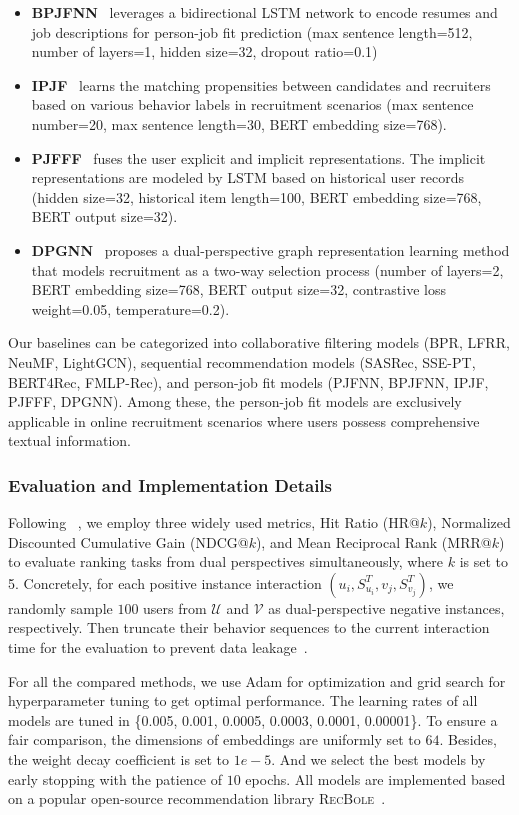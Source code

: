\begin{itemize}
\item {\textbf{BPJFNN}~\cite{qin2018enhancing}} leverages a bidirectional LSTM network to encode resumes and job descriptions for person-job fit prediction (max sentence length=512, number of layers=1, hidden size=32, dropout ratio=0.1)
\item {\textbf{IPJF}~\cite{le2019towards}} learns the matching propensities between candidates and recruiters based on various behavior labels in recruitment scenarios (max sentence number=20, max sentence length=30, BERT embedding size=768).
\item {\textbf{PJFFF}~\cite{jiang2020learning}} fuses the user explicit and implicit representations. The implicit representations are modeled by LSTM based on historical user records (hidden size=32, historical item length=100, BERT embedding size=768, BERT output size=32).
\item {\textbf{DPGNN}~\cite{yang2022modeling}} proposes a dual-perspective graph representation learning method that models recruitment as a two-way selection process (number of layers=2, BERT embedding size=768, BERT output size=32, contrastive loss weight=0.05, temperature=0.2).
\end{itemize}
Our baselines can be categorized into collaborative filtering models (\ie BPR, LFRR, NeuMF, LightGCN), sequential recommendation models (\ie SASRec, SSE-PT, BERT4Rec, FMLP-Rec), and person-job fit models (\ie PJFNN, BPJFNN, IPJF, PJFFF, DPGNN). Among these, the person-job fit models are exclusively applicable in online recruitment scenarios where users possess comprehensive textual information.

\subsubsection{Evaluation and Implementation Details}
Following ~\cite{yang2022modeling}, we employ three widely used metrics, Hit Ratio (HR@$k$), Normalized Discounted Cumulative Gain (NDCG@$k$), and Mean Reciprocal Rank (MRR@$k$) to evaluate ranking tasks from dual perspectives simultaneously, where $k$ is set to 5.
Concretely, for each positive instance interaction $(u_i, {S}^T_{u_i}, v_j, {S}^T_{v_j})$, we randomly sample $100$ users from $\mathcal{U}$ and $\mathcal{V}$ as dual-perspective negative instances, respectively. Then truncate their behavior sequences to the current interaction time for the evaluation to prevent data leakage~\cite{zhao2022revisiting}.

For all the compared methods, we use Adam for optimization and grid search for hyperparameter tuning to get optimal performance. The learning rates of all models are tuned in \{0.005, 0.001, 0.0005, 0.0003, 0.0001, 0.00001\}.
To ensure a fair comparison, the dimensions of embeddings are uniformly set to $64$. Besides, the weight decay coefficient is set to $1e-5$. And we select the best models by early stopping with the patience of $10$ epochs.
All models are implemented based on a popular open-source recommendation library \textsc{RecBole}~\cite{zhao2021recbole,zhao2022recbole}.

